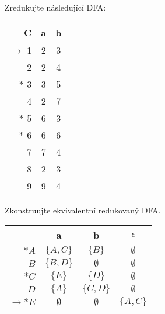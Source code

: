 \documentclass[a4paper,12pt]{amsart}
\begin{document}
\medskip\begin{problem}    
    
    Zredukujte následující DFA:
    
    \begin{center}
        \begin{tabular}{ r | c c }
            C & a & b \\ \hline
            $\to$ 1 & 2 & 3 \\
            2 & 2 & 4 \\
            $\ast$ 3 & 3 & 5 \\
            4 & 2 & 7 \\
            $\ast$ 5 & 6 & 3 \\
            $\ast$ 6 & 6 & 6 \\
            7 & 7 & 4 \\
            8 & 2 & 3 \\
            9 & 9 & 4
        \end{tabular}
    \end{center}

\end{problem}


\medskip\begin{problem}

    Zkonstruujte ekvivalentní redukovaný DFA.    
    
    \begin{center}
        \begin{tabular}{ r | c c c }
            & a & b & $\epsilon$ \\ \hline
            $\ast A$ & $\{A,C\}$ & $\{B\}$ & $\emptyset$ \\
            $B$ & $\{B,D\}$ & $\emptyset$ & $\emptyset$ \\
            $\ast C$ & $\{E\}$ & $\{D\}$ & $\emptyset$ \\
            $D$ & $\{A\}$ & $\{C,D\}$ & $\emptyset$ \\
            $\to\ast E$ & $\emptyset$ & $\emptyset$ & $\{A,C\}$
        \end{tabular}
    \end{center}

\end{problem}
\end{document}
